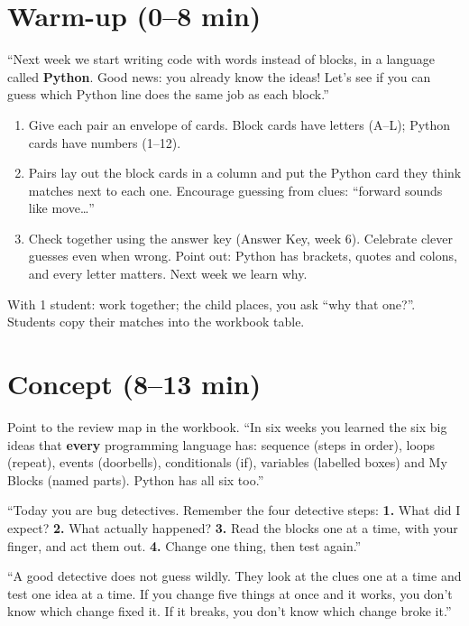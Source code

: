 \section{Warm-up (0--8 min)}
\begin{unplugged}
\enquote{Next week we start writing code with words instead of blocks, in a language called \textbf{Python}. Good news: you already know the ideas! Let's see if you can guess which Python line does the same job as each block.}
\begin{enumerate}[leftmargin=1.4em,itemsep=1pt]
  \item Give each pair an envelope of cards. Block cards have letters (A--L); Python cards have numbers (1--12).
  \item Pairs lay out the block cards in a column and put the Python card they think matches next to each one. Encourage guessing from clues: \enquote{forward sounds like move\ldots}
  \item Check together using the answer key (Answer Key, week 6). Celebrate clever guesses even when wrong. Point out: Python has brackets, quotes and colons, and every letter matters. Next week we learn why.
\end{enumerate}
With 1 student: work together; the child places, you ask \enquote{why that one?}. Students copy their matches into the workbook table.
\end{unplugged}

\section{Concept (8--13 min)}
\begin{teacherscript}
Point to the review map in the workbook. \enquote{In six weeks you learned the six big ideas that \textbf{every} programming language has: sequence (steps in order), loops (repeat), events (doorbells), conditionals (if), variables (labelled boxes) and My Blocks (named parts). Python has all six too.}

\enquote{Today you are bug detectives. Remember the four detective steps: \textbf{1.} What did I expect? \textbf{2.} What actually happened? \textbf{3.} Read the blocks one at a time, with your finger, and act them out. \textbf{4.} Change one thing, then test again.}
\end{teacherscript}

\begin{analogy}
\enquote{A good detective does not guess wildly. They look at the clues one at a time and test one idea at a time. If you change five things at once and it works, you don't know which change fixed it. If it breaks, you don't know which change broke it.}
\end{analogy}

